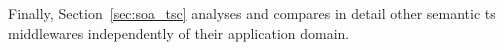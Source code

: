 Finally, Section~\ref{sec:soa_tsc} analyses and compares in detail other semantic \ac{ts} middlewares independently of their application domain.










